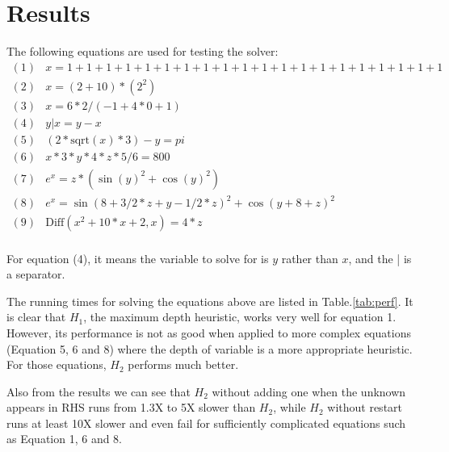 \documentclass{article}
\begin{document}
\section{Results}
The following equations are used for testing the solver:
\begin{displaymath}
\begin{split}
(1)& x = 1 + 1 + 1 + 1 + 1 + 1 + 1 + 1 + 1 + 1 + 1 + 1 + 1 + 1 + 1 + 1 + 1 + 1 + 1 + 1\\
(2)& x = (2 + 10) * (2^2)\\
(3)& x = 6 * 2 / (-1 + 4 * 0 + 1)\\
(4)& y | x = y - x\\
(5)& (2 * \text{sqrt}(x) * 3) - y = pi\\
(6)& x * 3 * y * 4 * z * 5 / 6 = 800\\
(7)& e^x = z * (\sin(y)^2 + \cos(y)^2)\\
(8)& e^x = \sin(8 + 3/2 * z + y - 1/2 * z)^2 + \cos(y + 8 + z)^2\\
(9)& \text{Diff}(x^2 + 10 * x + 2, x) = 4 * z\\
\end{split}
\end{displaymath}

For equation (4), it means the variable to solve for is $y$ rather than $x$, and the | is a separator.

The running times for solving the equations above are listed in Table.\ref{tab:perf}. It is clear that $H_1$, the maximum depth heuristic, works very well for equation 1. However, its performance is not as good when applied to more complex equations (Equation 5, 6 and 8) where the depth of variable is a more appropriate heuristic. For those equations, $H_2$ performs much better.

Also from the results we can see that $H_2$ without adding one when the unknown appears in RHS runs from 1.3X to 5X slower than $H_2$, while $H_2$ without restart runs at least 10X slower and even fail for sufficiently complicated equations such as Equation 1, 6 and 8.
\end{document}
